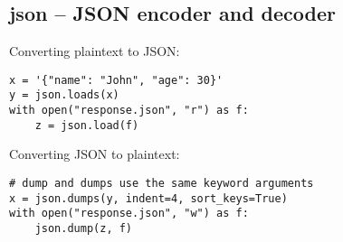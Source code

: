 %

\subsection{json -- JSON encoder and decoder}
Converting plaintext to JSON:
\begin{verbatim}
x = '{"name": "John", "age": 30}'
y = json.loads(x)
with open("response.json", "r") as f:
    z = json.load(f)
\end{verbatim}

Converting JSON to plaintext:
\begin{verbatim}
# dump and dumps use the same keyword arguments
x = json.dumps(y, indent=4, sort_keys=True)
with open("response.json", "w") as f:
    json.dump(z, f)
\end{verbatim}

%